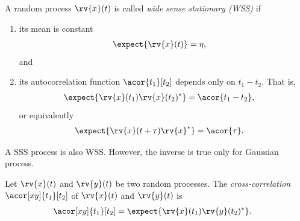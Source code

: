 \begin{definitionBox}
    A random process $\rv{x}(t)$ is called \emph{wide sense stationary (WSS)} if 
    \begin{enumerate}
        \item its mean is constant
        \begin{align}
            \expect{\rv{x}(t)} &= \eta,
        \end{align}
        and
        \item its autocorrelation function $\acor{t_{1}}[t_{2}]$ depends only on $t_{1} - t_{2}$. That is,
        \begin{align}
            \expect{\rv{x}(t_{1})\rv{x}(t_{2})^{\herm}} &= \acor{t_{1}-t_{2}},
        \end{align}
        or equivalently
        \begin{align}
            \expect{\rv{x}(t+\tau)\rv{x}^{\herm}} &= \acor{\tau}.
        \end{align}
    \end{enumerate}
\end{definitionBox}

\begin{remarkBox}
    A SSS process is also WSS. However, the inverse is true only for Gaussian process.
\end{remarkBox}

\begin{definitionBox}[Crosscorrelation]
    Let $\rv{x}(t)$ and $\rv{y}(t)$ be two random processes. The \emph{cross-correlation} $\acor[xy]{t_{1}}[t_{2}]$ of $\rv{x}(t)$ and $\rv{y}(t)$ is
    \begin{align}
        \acor[xy]{t_{1}}[t_{2}] &= \expect{\rv{x}(t_{1})\rv{y}(t_{2})^{\herm}}.
    \end{align}
\end{definitionBox}

